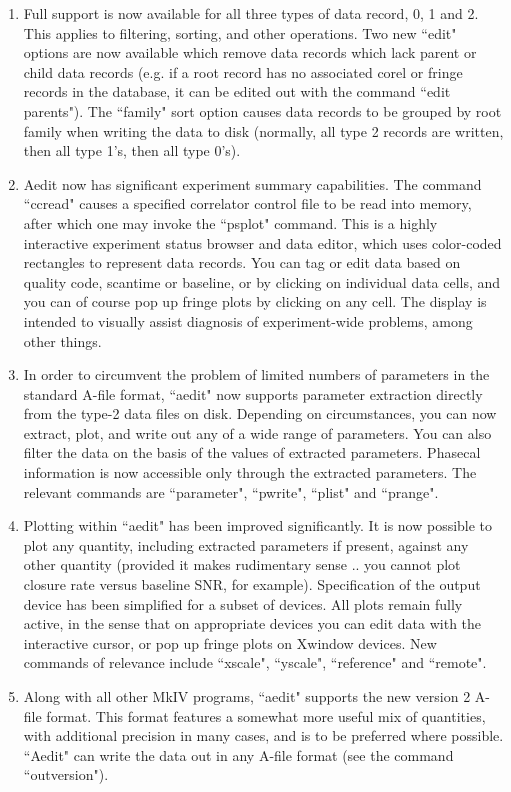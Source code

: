 \begin{center}
\begin{enumerate}
\item Full support is now available for all three types of data record,
0, 1 and 2.  This applies to filtering, sorting, and other operations.
Two new ``edit" options are now available which remove data records
which lack parent or child data records (e.g. if a root record has no
associated corel or fringe records in the database, it can be edited
out with the command ``edit parents").  The ``family" sort option causes
data records to be grouped by root family when writing the data to disk
(normally, all type 2 records are written, then all type 1's, then all
type 0's).
\item Aedit now has significant experiment summary capabilities.  The
command ``ccread" causes a specified correlator control file to be read
into memory, after which one may invoke the ``psplot" command.  This is
a highly interactive experiment status browser and data editor, which
uses color-coded rectangles to represent data records.  You can tag or
edit data based on quality code, scantime or baseline, or by clicking on
individual data cells, and you can of course pop up fringe plots by 
clicking on any cell.  The display is intended to visually assist 
diagnosis of experiment-wide problems, among other things.
\item In order to circumvent the problem of limited numbers of parameters
in the standard A-file format, ``aedit" now supports parameter extraction
directly from the type-2 data files on disk.  Depending on circumstances,
you can now extract, plot, and write out any of a wide range of parameters.
You can also filter the data on the basis of the values of extracted parameters.
Phasecal information is now accessible only through the extracted
parameters.  The relevant commands are ``parameter", ``pwrite", ``plist"
and ``prange".
\item Plotting within ``aedit" has been improved significantly.  It is now
possible to plot any quantity, including extracted parameters if present,
against any other quantity (provided it makes rudimentary sense .. you
cannot plot closure rate versus baseline SNR, for example).  Specification
of the output device has been simplified for a subset of devices.  All
plots remain fully active, in the sense that on appropriate devices you can
edit data with the interactive cursor, or pop up fringe plots on Xwindow
devices.  New commands of relevance include ``xscale", ``yscale", ``reference"
and ``remote".
\item Along with all other MkIV programs, ``aedit" supports the new version 2
A-file format.  This format features a somewhat more useful mix of quantities,
with additional precision in many cases, and is to be preferred where
possible.  ``Aedit" can write the data out in any A-file format (see the
command ``outversion").
\end{enumerate}


\end{center}
